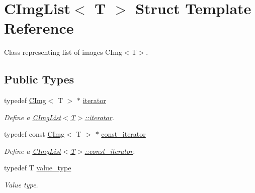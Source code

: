 \hypertarget{structcimg__library_1_1CImgList}{
\section{CImgList$<$ T $>$ Struct Template Reference}
\label{structcimg__library_1_1CImgList}
}


Class representing list of images CImg$<$T$>$.  


\subsection*{Public Types}
\begin{DoxyCompactItemize}
\item 
\hypertarget{structcimg__library_1_1CImgList_a7c1c29e319c572a740b103b024f37034}{
typedef \hyperlink{structcimg__library_1_1CImg}{CImg}$<$ T $>$ $\ast$ \hyperlink{structcimg__library_1_1CImgList_a7c1c29e319c572a740b103b024f37034}{iterator}}
\label{structcimg__library_1_1CImgList_a7c1c29e319c572a740b103b024f37034}

\begin{DoxyCompactList}\small\item\em Define a \hyperlink{structcimg__library_1_1CImgList_a7c1c29e319c572a740b103b024f37034}{CImgList$<$T$>$::iterator}. \item\end{DoxyCompactList}\item 
\hypertarget{structcimg__library_1_1CImgList_a449d35504b2500efc67af75ba3bf9277}{
typedef const \hyperlink{structcimg__library_1_1CImg}{CImg}$<$ T $>$ $\ast$ \hyperlink{structcimg__library_1_1CImgList_a449d35504b2500efc67af75ba3bf9277}{const\_\-iterator}}
\label{structcimg__library_1_1CImgList_a449d35504b2500efc67af75ba3bf9277}

\begin{DoxyCompactList}\small\item\em Define a \hyperlink{structcimg__library_1_1CImgList_a449d35504b2500efc67af75ba3bf9277}{CImgList$<$T$>$::const\_\-iterator}. \item\end{DoxyCompactList}\item 
\hypertarget{structcimg__library_1_1CImgList_a265a253612b46abed17c61b0a5e5ce30}{
typedef T \hyperlink{structcimg__library_1_1CImgList_a265a253612b46abed17c61b0a5e5ce30}{value\_\-type}}
\label{structcimg__library_1_1CImgList_a265a253612b46abed17c61b0a5e5ce30}

\begin{DoxyCompactList}\small\item\em Value type. \item\end{DoxyCompactList}\end{DoxyCompactItemize}
